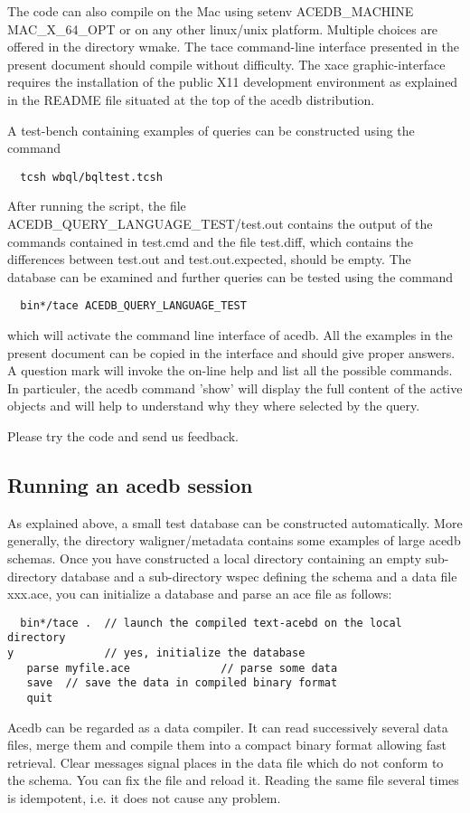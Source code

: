 \documentclass[11pt]{article}
\newcommand{\BL}{\begin{lstlisting}}
\begin{document}
The code can also compile on the Mac using 
setenv ACEDB\_MACHINE  MAC\_X\_64\_OPT
or on any other linux/unix platform. Multiple choices are offered in the directory wmake.
The tace command-line interface presented in the present document
should compile without difficulty.
The xace graphic-interface requires 
the installation of the public X11 development environment
as explained in the README file situated at the top of the acedb distribution.

A test-bench containing examples of queries can be constructed
using the command
\BL
  tcsh wbql/bqltest.tcsh
\end{lstlisting}
After running the script, 
the file ACEDB\_QUERY\_LANGUAGE\_TEST/test.out contains the output of
the commands contained in test.cmd and the file test.diff,
which contains the differences between test.out and test.out.expected, should be empty.
The database can be examined and
further queries can be tested using the command
\BL
  bin*/tace ACEDB_QUERY_LANGUAGE_TEST
\end{lstlisting}
which will activate the command line interface of acedb. All the examples
in the present document can be copied in the interface and
should give proper answers. A question mark will invoke
the on-line help and list all the possible commands.
In particuler, the acedb command 'show' will display
the full content of the active objects and will help to understand why 
they where selected by the query. 

Please try the code and send us feedback. 



\subsection {Running an acedb session}

As explained above, a small test database can be constructed
automatically.
More generally, the directory waligner/metadata contains 
some examples of large acedb schemas.
Once you have constructed a local directory
containing an empty sub-directory database and a sub-directory wspec
defining the schema and a data file xxx.ace, you can
initialize a database and parse an ace file as follows:
\BL
  bin*/tace .  // launch the compiled text-acebd on the local directory
y              // yes, initialize the database
   parse myfile.ace              // parse some data
   save  // save the data in compiled binary format 
   quit
\end{lstlisting}
 Acedb can be regarded as a data compiler. It can read successively several
data files, merge them and compile them into a compact binary format allowing
fast retrieval. Clear messages signal places in the data file which do not conform
to the schema. You can fix the file and reload it. Reading the same file several
times is idempotent, i.e. it does not cause any problem.
\end{document}
